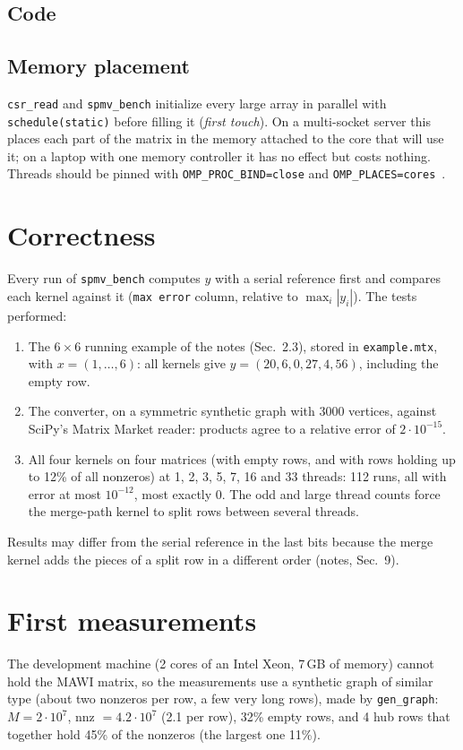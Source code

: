 \documentclass[11pt,a4paper]{article}
\begin{document}
\subsection{Code}


\subsection{Memory placement}
\texttt{csr\_read} and \texttt{spmv\_bench} initialize every large array in parallel with
\texttt{schedule(static)} before filling it (\emph{first touch}). On a multi-socket server
this places each part of the matrix in the memory attached to the core that will use it;
on a laptop with one memory controller it has no effect but costs nothing. Threads should be
pinned with \texttt{OMP\_PROC\_BIND=close} and \texttt{OMP\_PLACES=cores}~\cite{vdp}.

\section{Correctness}
Every run of \texttt{spmv\_bench} computes $y$ with a serial reference first and compares
each kernel against it (\texttt{max error} column, relative to $\max_i|y_i|$). The tests
performed:
\begin{enumerate}
  \item The $6\times6$ running example of the notes (Sec.~2.3), stored in
        \texttt{example.mtx}, with $x=(1,\dots,6)$: all kernels give
        $y=(20,6,0,27,4,56)$, including the empty row.
  \item The converter, on a symmetric synthetic graph with 3000 vertices, against SciPy's
        Matrix Market reader: products agree to a relative error of $2\cdot10^{-15}$.
  \item All four kernels on four matrices (with empty rows, and with rows holding up to 12\%
        of all nonzeros) at 1, 2, 3, 5, 7, 16 and 33 threads: 112 runs, all with error at
        most $10^{-12}$, most exactly 0. The odd and large thread counts force the
        merge-path kernel to split rows between several threads.
\end{enumerate}
Results may differ from the serial reference in the last bits because the merge kernel adds
the pieces of a split row in a different order (notes, Sec.~9).

\section{First measurements}
The development machine (2 cores of an Intel Xeon, 7\,GB of memory) cannot hold the MAWI
matrix, so the measurements use a synthetic graph of similar type (about two nonzeros per
row, a few very long rows), made by \texttt{gen\_graph}: $M = 2\cdot10^7$, nnz $=4.2\cdot10^7$ (2.1 per row), 32\% empty rows,
and 4 hub rows that together hold 45\% of the nonzeros (the largest one 11\%).
\end{document}
